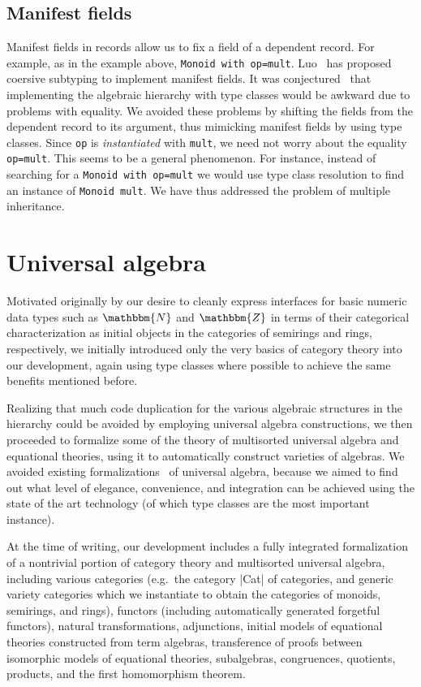 \documentclass[a4paper,10pt,runningheads]{llncs}
\newcommand{\N}{\ensuremath{\mathbbm{N}}}
\newcommand{\Z}{\ensuremath{\mathbbm{Z}}}
\begin{document}
\subsection{Manifest fields}\label{manifest}

Manifest fields in records allow us to fix a field of a dependent record. For example, as in the
example above, \lstinline|Monoid with op=mult|. 
Luo~\cite{DBLP:conf/types/Luo08} has proposed coersive subtyping to implement manifest fields.
It was conjectured~\cite{Hints} that implementing the algebraic hierarchy with type classes would
be awkward due to problems with equality. We avoided these problems by shifting the fields
from the dependent record to its argument, thus mimicking manifest fields by using type classes.
Since \lstinline|op| is \emph{instantiated} with \lstinline|mult|, we need not worry about the
equality \lstinline|op=mult|. This seems to be a general phenomenon. For instance, instead of searching
for a \lstinline|Monoid with op=mult| we would use type class resolution to find an instance of \lstinline|Monoid mult|.
We have thus addressed the problem of multiple inheritance.

\section{Universal algebra}\label{univ}
Motivated originally by our desire to cleanly express interfaces for basic numeric data types such as $\N$ and $\Z$ in terms of their categorical characterization as initial objects in the categories of semirings and rings, respectively, we initially introduced only the very basics of category theory into our development, again using type classes where possible to achieve the same benefits mentioned before.

Realizing that much code duplication for the various algebraic structures in the hierarchy could be avoided by employing universal algebra constructions, we then proceeded to formalize some of the theory of multisorted universal algebra and equational theories, using it to automatically construct varieties of algebras. We avoided existing formalizations~\cite{DBLP:conf/tphol/Capretta99,dominguez2008formalizing} of universal algebra, because we aimed to find out what level of elegance, convenience, and integration can be achieved using the state of the art technology (of which type classes are the most important instance).

At the time of writing, our development includes a fully integrated formalization of a nontrivial portion of category theory and multisorted universal algebra, including various categories (e.g.\ the category |Cat| of categories, and generic variety categories which we instantiate to obtain the categories of monoids, semirings, and rings), functors (including automatically generated forgetful functors), natural transformations, adjunctions, initial models of equational theories constructed from term algebras, transference of proofs between isomorphic models of equational theories, subalgebras, congruences, quotients, products, and the first homomorphism theorem.
\end{document}
